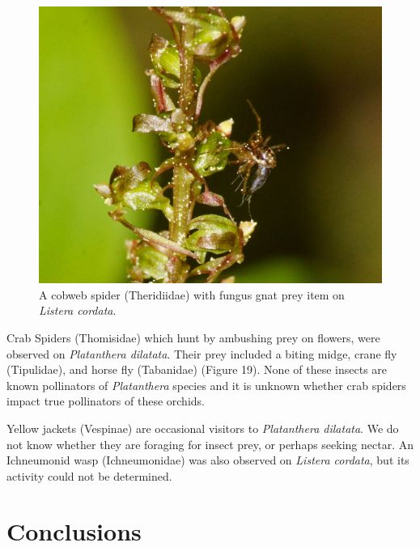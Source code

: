 \begin{multicols}{2}
\begin{figure}[H]
\begin{center}
\vspace{2mm}
\includegraphics[width=\textwidth]{img/Theridiidae_Sciaroidea.jpg}
\caption{A cobweb spider (Theridiidae) with fungus gnat prey item on \emph{Listera cordata}.}
\label{Theridiidae_Sciaroidea}
\end{center}
\end{figure}




Crab Spiders (Thomisidae) which hunt by ambushing prey on flowers, were
observed on \emph{Platanthera dilatata}. Their prey included a biting
midge, crane fly (Tipulidae), and horse fly (Tabanidae) (Figure 19).
None of these insects are known pollinators of \emph{Platanthera}
species and it is unknown whether crab spiders impact true pollinators
of these orchids.

Yellow jackets (Vespinae) are occasional visitors to \emph{Platanthera
dilatata}. We do not know whether they are foraging for insect prey, or
perhaps seeking nectar. An Ichneumonid wasp (Ichneumonidae) was also
observed on \emph{Listera cordata}, but its activity could not be
determined.

\section{Conclusions}


\end{multicols}
